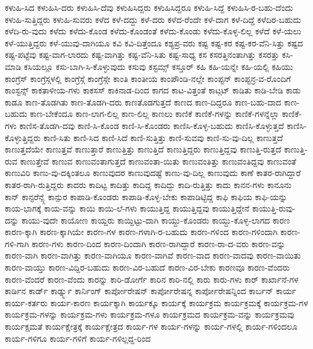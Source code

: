 {ಕಳುಹಿ-ಸಿದ
ಕಳುಹಿಸಿ-ದರು
ಕಳುಹಿಸಿ-ದೆವು
ಕಳುಹಿಸಿದ್ದರು
ಕಳುಹಿಸಿದ್ದರೂ
ಕಳುಹಿ-ಸಿದ್ದೆ
ಕಳುಹಿಸಿ-ರ-ಬಹು-ದೆಂದು
ಕಳುಹಿ-ಸುತ್ತಿದ್ದರು
ಕಳುಹಿ-ಸುವರು
ಕಳೆದ
ಕಳೆ-ದದ್ದು
ಕಳೆ-ದರು
ಕಳೆದ-ರೆಂದೇ
ಕಳೆ-ದಾಗ
ಕಳೆ-ದಿದ್ದೆ
ಕಳೆದಿರ-ಬಹುದು
ಕಳೆದಿ-ರು-ವುದು
ಕಳೆದು
ಕಳೆದು-ಕೊಂಡ
ಕಳೆದು-ಕೊಂಡಂತೆ
ಕಳೆದು-ಕೊಂಡು
ಕಳೆದು-ಕೊಳ್ಳ-ಲಿಲ್ಲ
ಕಳೆದೆ
ಕಳೆ-ಯಲು
ಕಳೆ-ಯುತ್ತಿದ್ದರು
ಕಳೆ-ಯುವು-ದಾಗಿಯೂ
ಕವಿ
ಕವಿ-ದಿತ್ತೆಂದೂ
ಕಶ್ಯಪ್ರ-ವರು
ಕಷ್ಟ
ಕಷ್ಟ-ಕರ
ಕಷ್ಟ-ಕರ-ವೆನಿ-ಸಿತ್ತು
ಕಷ್ಟದ
ಕಷ್ಟ-ಪಟ್ಟೆವು
ಕಷ್ಟ-ವಾಗ-ಲಾರದು
ಕಷ್ಟ-ವಾಗಿತ್ತು
ಕಷ್ಟ-ವೆನಿ-ಸಿತು
ಕಷ್ಟ-ಸಾಧ್ಯ
ಕಸ
ಕಸರತ್ತಿನಂತಾಗಿತ್ತು
ಕಸರತ್ತು
ಕಸಿ-ಮಾಡಿ
ಕಸಿಯಲ್ಲೂ
ಕಸು-ಬಾಗಿ-ಸಿ-ಕೊಳ್ಳುವುದು
ಕಸುವು
ಕಸ್ಟಮ್ಸ್
ಕಸ್ತೂರ್
ಕಹಿ
ಕಹಿ-ಯನ್ನೇ
ಕಹಿ-ಯಲ್ಲಿ
ಕಹಿಯು
ಕಾಂಗ್ರೆಸ್
ಕಾಂಗ್ರೆಸ್ಗಳಲ್ಲಿ
ಕಾಂಗ್ರೆಸ್ಗೆ
ಕಾಂಗ್ರೆಸ್ಗೇ
ಕಾಂತಿ
ಕಾಂತೀಯ
ಕಾಂಪೌಂಡಿ-ನಲ್ಲೇ
ಕಾಂಪ್ಟನ್
ಕಾಂಪ್ಟನ್ರ-ವ-ರೊಂದಿಗೆ
ಕಾಂಸ್ಟನ್ಸ್
ಕಾಕತಾಳೀಯ-ಗಳು
ಕಾಕಸಸ್
ಕಾಕಿನಾಡ-ದಿಂದ
ಕಾಗದ
ಕಾಟ-ವಿತ್ತಂತೆ
ಕಾಟ್ಗಟ್
ಕಾಡಿತು
ಕಾಡಿ-ಬೇಡಿ
ಕಾಡು
ಕಾಡೂ
ಕಾಣ-ತೊಡಗಿತು
ಕಾಣ-ತೊಡಗಿ-ದರು
ಕಾಣತೊಡಗುತ್ತದೆ
ಕಾಣದ
ಕಾಣ-ದಿದ್ದರೂ
ಕಾಣ-ಬಹು-ದಾದ
ಕಾಣ-ಬಹುದು
ಕಾಣ-ಬೇಕೆಂದೂ
ಕಾಣ-ಲಾಗ-ಲಿಲ್ಲ
ಕಾಣ-ಲಿಲ್ಲ
ಕಾಣಲು
ಕಾಣಿಕೆ
ಕಾಣಿಕೆ-ಗಳನ್ನು
ಕಾಣಿಕೆ-ಗಳನ್ನೆಲ್ಲಾ
ಕಾಣಿಕೆ-ಗಳು
ಕಾಣಿಸ-ತೊಡಗಿ-ದವು
ಕಾಣಿ-ಸಿ-ಕೊಂಡ
ಕಾಣಿ-ಸಿ-ಕೊಂಡರು
ಕಾಣಿಸಿ-ಕೊಳ್ಳ-ಬಹುದು
ಕಾಣಿಸಿ-ಕೊಳ್ಳುತ್ತದೆ
ಕಾಣಿಸಿ-ಕೊಳ್ಳುತ್ತಿದ್ದರು
ಕಾಣಿ-ಸಿತು
ಕಾಣಿ-ಸಿದ
ಕಾಣಿ-ಸಿದೆ
ಕಾಣಿ-ಸುತ್ತಿತ್ತು
ಕಾಣಿ-ಸುವವು
ಕಾಣಿ-ಸು-ವು-ದಿಲ್ಲ
ಕಾಣುತ್ತದೆ
ಕಾಣುತ್ತದೆಯೇ
ಕಾಣುತ್ತವೆ
ಕಾಣುತ್ತಾರೆ
ಕಾಣುತ್ತಿತ್ತು
ಕಾಣುತ್ತಿದೆ
ಕಾಣುತ್ತಿದ್ದರು
ಕಾಣುತ್ತಿದ್ದವು
ಕಾಣುತ್ತಿ-ರುತ್ತದೆ
ಕಾಣುತ್ತಿ-ರುವ
ಕಾಣುತ್ತೇವೆ
ಕಾಣುವ
ಕಾಣುವಂತಾಗುತ್ತದೆ
ಕಾಣುವಂತಾ-ಯಿತು
ಕಾಣುವಂತಿತ್ತು
ಕಾಣುವಂತಿದ್ದವು
ಕಾಣುವಂತೆ
ಕಾಣುವಿರಿ
ಕಾಣು-ವು-ದಕ್ಕಿಂತಲೂ
ಕಾಣುವುದರ
ಕಾಣುವುದಷ್ಟೆ
ಕಾಣು-ವು-ದಿಲ್ಲ
ಕಾಣುವುದು
ಕಾಣೆ
ಕಾತರ-ರಾಗಿದ್ದಾರೆ
ಕಾತರ-ರಾಗಿ-ರುತ್ತಿದ್ದರು
ಕಾದರು
ಕಾದಿಟ್ಟ
ಕಾದಿತ್ತು
ಕಾದಿದ್ದ
ಕಾದಿದ್ದು
ಕಾದಿ-ರುತ್ತಿತ್ತು
ಕಾದು
ಕಾನನ-ಗಳು
ಕಾನೂನು
ಕಾನ್
ಕಾನ್ಫರೆನ್ಸ್ಗೆ
ಕಾನ್ಪುರ
ಕಾಪಾಡಿ-ಕೊಂಡರು
ಕಾಪಾಡಿ-ಕೊಳ್ಳ-ಬೇಕು
ಕಾಪಾಡಿಟ್ಟಿದ್ದ
ಕಾಫಿ
ಕಾಫಿಯ
ಕಾಫಿ-ಯನ್ನು
ಕಾಯ-ಭಾಗಕ್ಕೆ
ಕಾಯ-ವನ್ನು
ಕಾಯಿ
ಕಾಯಿ-ಲೆ-ಗಳು
ಕಾಯುತ್ತಿದ್ದ
ಕಾಯುತ್ತಿದ್ದವು
ಕಾಯುತ್ತಿದ್ದೇನೆ
ಕಾಯುತ್ತಿ-ರುವು-ದನ್ನು
ಕಾಯು-ವುದೇ
ಕಾಯೋಣ
ಕಾಯ್ದರು
ಕಾಯ್ದಿಟ್ಟು-ದಾಗಿ
ಕಾಯ್ದು-ಕೊಂಡರು
ಕಾಯ್ದು-ಕೊಳ್ಳ-ಲಾಗದ
ಕಾರಣ
ಕಾರಣ-ಕ್ಕಾಗಿ
ಕಾರಣ-ಕ್ಕಾಗಿಯೇ
ಕಾರಣ-ಗಳ
ಕಾರಣ-ಗಳಾಗಿ-ರ-ಬಹುದು
ಕಾರಣ-ಗಳಿಂದ
ಕಾರಣ-ಗಳಿಂದಾಗಿ
ಕಾರಣ-ಗಳಿ-ಗಾಗಿ
ಕಾರಣ-ಗಳು
ಕಾರಣ-ದಿಂದ
ಕಾರಣ-ದಿಂದಾಗಿ
ಕಾರಣ-ರಾಗಿದ್ದಾರೆ
ಕಾರಣ-ರಾ-ದ-ವರು
ಕಾರಣ-ವನ್ನು
ಕಾರಣ-ವಾಗಿ
ಕಾರಣ-ವಾಗಿತ್ತು
ಕಾರಣ-ವಾಗಿಯೂ
ಕಾರಣ-ವಾಗಿವೆ
ಕಾರಣ-ವಾದ
ಕಾರಣ-ವಾದವು
ಕಾರಣ-ವಾಯಿತು
ಕಾರಣ-ವಾಯ್ತು
ಕಾರಣ-ವಿದ್ದಿರ-ಬಹುದು
ಕಾರಣ-ವಿರ-ಬಹುದೆ
ಕಾರಣ-ವಿರ-ಬೇಕು
ಕಾರಣವೂ
ಕಾರಣ-ವೆಂದರು
ಕಾರಣ-ವೆಂದರೆ
ಕಾರಣ-ವೆಂದು
ಕಾರನ್ನು
ಕಾರಿ-ಡೋರ್ಗೆ
ಕಾರಿನ
ಕಾರಿ-ನಲ್ಲಿ
ಕಾರು
ಕಾರು-ಗಳು
ಕಾರ್
ಕಾರ್ಖಾನೆ-ಗಳ
ಕಾರ್ಡಿನ
ಕಾರ್ಡ್
ಕಾರ್ಡ್ನ್ನು
ಕಾರ್ನಿಂಗ್
ಕಾರ್ಪೋರೇಷನ್
ಕಾರ್ಪೋರೇಷನ್ನ
ಕಾರ್ಪೋರೇಷನ್ನಿಂದ
ಕಾರ್ಬನ್
ಕಾರ್ಯ
ಕಾರ್ಯ-ಕರ್ತರು
ಕಾರ್ಯ-ಕಾರಣ
ಕಾರ್ಯಕ್ಕಾಗಿ
ಕಾರ್ಯಕ್ಕೂ
ಕಾರ್ಯಕ್ಕೆ
ಕಾರ್ಯಕ್ರಮ
ಕಾರ್ಯಕ್ರಮಕ್ಕೆ
ಕಾರ್ಯಕ್ರಮ-ಗಳ
ಕಾರ್ಯಕ್ರಮ-ಗಳನ್ನು
ಕಾರ್ಯಕ್ರಮ-ಗಳು
ಕಾರ್ಯಕ್ರಮ-ಗಳೂ
ಕಾರ್ಯಕ್ರಮದ
ಕಾರ್ಯಕ್ರಮ-ವನ್ನು
ಕಾರ್ಯಕ್ರಮವು
ಕಾರ್ಯಕ್ಷಮತೆ
ಕಾರ್ಯಕ್ಷೇತ್ರಕ್ಕೆ
ಕಾರ್ಯಕ್ಷೇತ್ರದ
ಕಾರ್ಯ-ಗಳ
ಕಾರ್ಯ-ಗಳನ್ನು
ಕಾರ್ಯ-ಗಳಲ್ಲಿ
ಕಾರ್ಯ-ಗಳಿಂದಲೂ
ಕಾರ್ಯ-ಗಳಿಗೂ
ಕಾರ್ಯ-ಗಳಿಗೆ
ಕಾರ್ಯ-ಗಳಿಲ್ಲದ್ದ-ರಿಂದ
}
